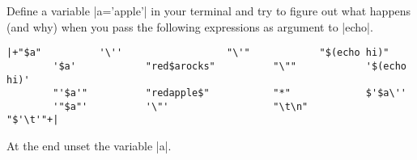 
    Define a variable \bash|a='apple'| in your terminal and try to figure out what happens (and why) when you pass the following expressions as argument to \bash|echo|.
    \begin{lstlisting}[style=MyBash, moredelim={[is][\color{strings-color}]{|+}{+|}}]
        |+"$a"          '\''                  "\'"            "$(echo hi)"
        '$a'            "red$arocks"          "\""            '$(echo hi)'
        "'$a'"          "redapple$"           "*"             $'$a\''
        '"$a"'          '\"'                  "\t\n"          "$'\t'"+|
    \end{lstlisting}
    At the end unset the variable \bash|a|.
\EndExercise[DodgerBlue]



